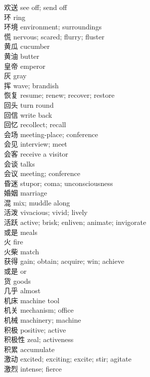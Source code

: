 欢送 \quad see off; send off\\
环 \quad ring\\
环境 \quad environment; surroundings\\
慌 \quad nervous; scared; flurry; fluster\\
黄瓜 \quad cucumber\\
黄油 \quad butter\\
皇帝 \quad emperor\\
灰 \quad gray\\
挥 \quad wave; brandish\\
恢复 \quad resume; renew; recover; restore\\
回头 \quad turn round\\
回信 \quad write back\\
回忆 \quad recollect; recall\\
会场 \quad meeting-place; conference\\
会见 \quad interview; meet\\
会客 \quad receive a visitor\\
会谈 \quad talks\\
会议 \quad meeting; conference\\
昏迷 \quad stupor; coma; unconsciousness\\
婚姻 \quad marriage\\
混 \quad mix; muddle along\\
活泼 \quad vivacious; vivid; lively\\
活跃 \quad active; brisk; enliven; animate; invigorate\\
或是 \quad meals\\
火 \quad fire\\
火柴 \quad match\\
获得 \quad gain; obtain; acquire; win; achieve\\
或是 \quad or\\
货 \quad goods\\
几乎 \quad almost\\
机床 \quad machine tool\\
机关 \quad mechanism; office\\
机械 \quad machinery; machine\\
积极 \quad positive; active\\
积极性 \quad zeal; activeness\\
积累 \quad accumulate\\
激动 \quad excited; exciting; excite; stir; agitate\\
激烈 \quad intense; fierce\\
